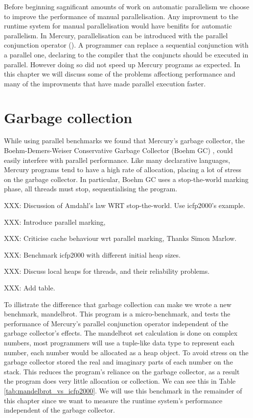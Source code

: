 

Before beginning sagnificant amounts of work on automatic parallelism we
choose to improve the performance of manual parallelisation.
Any improvment to the runtime system for manual parallelisation would have
benifits for automatic parallelism.
In Mercury, parallelisation can be introduced with the parallel conjunction
operator (\code{\&}).
A programmer can replace a sequential conjunction with a parallel one,
declaring to the compiler that the conjuncts should be executed in parallel.
However doing so did not speed up Mercury programs as expected.
In this chapter we will discuss
some of the problems affectiong performance and
many of the improvments that have made parallel execution faster.

\section{Garbage collection}

While using parallel benchmarks we found that Mercury's garbage collector,
the Boehm-Demers-Weiser Conservative Garbage Collector (Boehm GC)
\citep{boehm_gc},
could easily interfere with parallel performance.
Like many declarative languages,
Mercury programs tend to have a high rate of allocation,
placing a lot of stress on the garbage collector.
In particular,
Boehm GC uses a stop-the-world marking phase,
all threads must stop, sequentialising the program.

XXX: Discussion of Amdahl's law WRT stop-the-world.
Use icfp2000's example.

XXX: Introduce parallel marking,

XXX: Criticise cache behaviour wrt parallel marking,
Thanks Simon Marlow.

XXX: Benchmark icfp2000 with different initial heap sizes.

XXX: Discuss local heaps for threads, and their reliability problems.

XXX: Add table.

To illistrate the difference that garbage collection can make we wrote a new
benchmark, mandelbrot.
This program is a micro-benchmark, and tests the performance of 
Mercury's parallel conjunction operator independent of the garbage
collector's effects.
The mandelbrot set calculation is done on complex numbers,
most programmers will use a tuple-like data type to represent each number,
each number would be allocated as a heap object.
To avoid stress on the garbage collector stored the real and imaginary parts
of each number on the stack.
This reduces the program's reliance on the garbage collector,
as a result the program does very little allocation or collection.
We can see this in Table \ref{tab:mandelbrot_vs_icfp2000}.
We will use this benchmark in the remainder of this chapter since we want to
measure the runtime system's performance independent of the garbage collector.

